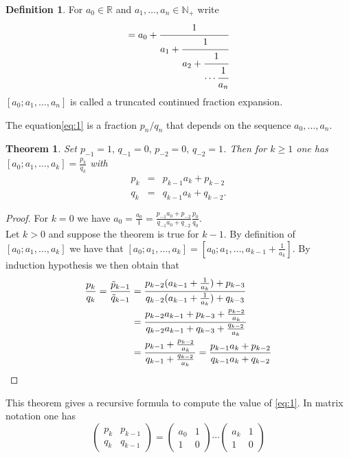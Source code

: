 \documentclass[a4paper,11pt,american]{article}
\newcommand{\N}{\mathbb{N}}
\newcommand{\R}{\mathbb{R}}
\theoremstyle{plain}
\newtheorem{theorem}{Theorem}
\theoremstyle{definition}
\newtheorem{definition}{Definition}
\begin{document}
  \begin{definition}
    For $a_0 \in \R$ and $a_1,\dots,a_n \in\N_+$ write
    \begin{equation}      
      [a_0;a_1,\dots,a_n] = a_0 + \cfrac{1}{a_1 + \cfrac{1}{a_2 + \cfrac{1}{\cdots  \cfrac{1}{a_n}}}}
      \label{eq:1}
    \end{equation}
    $[a_0;a_1,\dots,a_n]$ is called a truncated continued fraction expansion.
  \end{definition}
The equation\eqref{eq:1} is a fraction $p_n / q_n$ that depends on the sequence $a_0,\dots,a_n$.


\begin{theorem}
  \label{thr:2}
  Set $p_{-1} = 1,\, q_{-1} = 0,\, p_{-2} = 0,\, q_{-2} =1$. Then for $k\geq1$ one has $[a_0;a_1,\dots,a_k]=\frac{p_k}{q_k}$ with
  \begin{equation}
    \label{eq:2}
    \begin{array}{rcl}
    p_ k & = & p_{k-1} a_k + p_{k-2}\\
      q_ k & = & q_{k-1} a_k + q_{k-2}.
    \end{array}
  \end{equation}
  
\end{theorem}
  \begin{proof}
      For $k=0$ we have $a_0=\frac{a_0}{1}=\frac{p_{-1}a_0+p_{-2}}{q_{-1}a_0+q_{-2}}\frac{p_0}{q_0}$.\\
      Let $k>0$ and suppose the theorem is true for $k-1$. By definition of $[a_0;a_1,\dots,a_k]$ we have that $[a_0;a_1,\dots,a_k]=[a_0;a_1,\dots,a_{k-1}+\frac{1}{a_k}]$. By induction hypothesis we then obtain that \begin{align*}
          \frac{p_k}{q_k}=\frac{\Tilde{p}_{k-1}}{\Tilde{q}_{k-1}}&=\frac{p_{k-2}(a_{k-1}+\frac{1}{a_k}) + p_{k-3}}{q_{k-2} (a_{k-1}+\frac{1}{a_k}) + q_{k-3}}\\
          &=\frac{p_{k-2} a_{k-1} + p_{k-3}+\frac{p_{k-2}}{a_k}}{q_{k-2} a_{k-1} + q_{k-3}+\frac{q_{k-2}}{a_k}}\\
          &=\frac{p_{k-1}+\frac{p_{k-2}}{a_k}}{q_{k-1}+\frac{q_{k-2}}{a_k}}=\frac{p_{k-1} a_k + p_{k-2}}{q_{k-1} a_k + q_{k-2}}
      \end{align*}
  \end{proof}
This theorem gives a recursive formula to compute the value of \eqref{eq:1}. In matrix notation one has
\begin{equation}
  \label{eq:3}
  \begin{pmatrix}
    p_k & p_{k-1} \\
    q_k & q_{k-1}
  \end{pmatrix} =
  \begin{pmatrix}
    a_0 & 1\\
    1 & 0
  \end{pmatrix} \cdots
  \begin{pmatrix}
    a_k & 1 \\
    1 & 0
  \end{pmatrix}
\end{equation}
\end{document}
